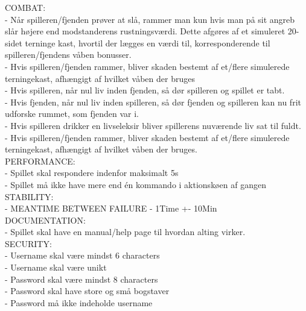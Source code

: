   COMBAT:\\
    - Når spilleren/fjenden prøver at slå, rammer man kun hvis man på sit angreb slår højere end modstanderens rustningsværdi. Dette afgøres af et simuleret 20-sidet terninge kast, hvortil der lægges en værdi til, korresponderende til spilleren/fjendens våben bonusser.\\
    - Hvis spilleren/fjenden rammer, bliver skaden bestemt af et/flere simulerede terningekast, afhængigt af hvilket våben der bruges\\
    - Hvis spilleren, når nul liv inden fjenden, så dør spilleren og spillet er tabt.\\
    - Hvis fjenden, når nul liv inden spilleren, så dør fjenden og spilleren kan nu frit udforske rummet, som fjenden var i.\\
    - Hvis spilleren drikker en livseleksir bliver spillerens nuværende liv sat til fuldt.\\
    - Hvis spilleren/fjenden rammer, bliver skaden bestemt af et/flere simulerede terningekast, afhængigt af hvilket våben der bruges.\\

PERFORMANCE:\\
    - Spillet skal respondere indenfor maksimalt 5s\\
    - Spillet må ikke have mere end én kommando i aktionskøen af gangen\\
  STABILITY:\\
    - MEANTIME BETWEEN FAILURE - 1Time +- 10Min\\
  DOCUMENTATION:\\
    - Spillet skal have en manual/help page til hvordan alting virker.\\
  SECURITY:\\
    - Username skal være mindst 6 characters\\
    - Username skal være unikt\\
    - Password skal være mindst 8 characters\\
    - Password skal have store og små bogstaver\\
    - Password må ikke indeholde username\\

